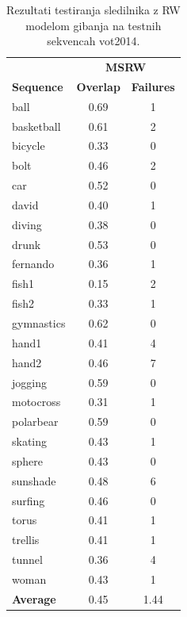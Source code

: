 \documentclass[a4paper]{article}
\begin{document}
\begin{table}[h!]
	\begin{center}
		\begin{tabular}{l c c}
			\hline 
			& \multicolumn{2}{c}{{\bf MSRW}}\\
			{\bf Sequence} & {\bf Overlap} & {\bf Failures} \\
			\hline 
			ball & 0.69 & 1\\
			basketball & 0.61 & 2\\
			bicycle & 0.33 & 0\\
			bolt & 0.46 & 2\\
			car & 0.52 & 0\\
			david & 0.40 & 1\\
			diving & 0.38 & 0\\
			drunk & 0.53 & 0\\
			fernando & 0.36 & 1\\
			fish1 & 0.15 & 2\\
			fish2 & 0.33 & 1\\
			gymnastics & 0.62 & 0\\
			hand1 & 0.41 & 4\\
			hand2 & 0.46 & 7\\
			jogging & 0.59 & 0\\
			motocross & 0.31 & 1\\
			polarbear & 0.59 & 0\\
			skating & 0.43 & 1\\
			sphere & 0.43 & 0\\
			sunshade & 0.48 & 6\\
			surfing & 0.46 & 0\\
			torus & 0.41 & 1\\
			trellis & 0.41 & 1\\
			tunnel & 0.36 & 4\\
			woman & 0.43 & 1\\
			\hline 
			{\bf Average} & 0.45 & 1.44\\
			\hline 
		\end{tabular}
	\end{center}
	\caption{Rezultati testiranja sledilnika z RW modelom gibanja na testnih sekvencah vot2014.}
	\label{tabelarw}
\end{table}
\end{document}
